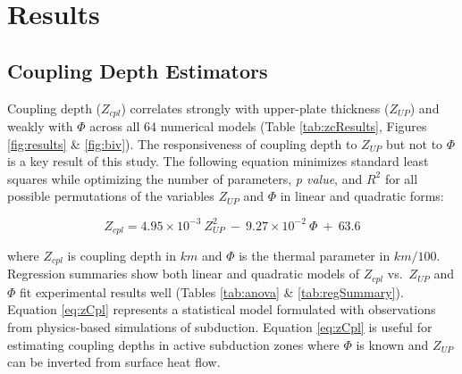 \hypertarget{chpt2Results}{%
\section{Results}\label{chpt2Results}}

\hypertarget{cdEstimators}{%
\subsection{Coupling Depth Estimators}\label{cdEstimators}}

Coupling depth (\(Z_{cpl}\)) correlates strongly with upper-plate thickness (\(Z_{UP}\)) and weakly with \(\Phi\) across all 64 numerical models (Table \ref{tab:zcResults}, Figures \ref{fig:results} \& \ref{fig:biv}). The responsiveness of coupling depth to \(Z_{UP}\) but not to \(\Phi\) is a key result of this study. The following equation minimizes standard least squares while optimizing the number of parameters, \emph{p value}, and \(R^2\) for all possible permutations of the variables \(Z_{UP}\) and \(\Phi\) in linear and quadratic forms:

\begin{equation}
  Z_{cpl} = 4.95\times 10^{-3}\ Z_{UP}^{2}\ -\ 9.27\times 10^{-2}\ \Phi\ +\ 63.6
  \label{eq:zCpl}
\end{equation}

where \(Z_{cpl}\) is coupling depth in \(km\) and \(\Phi\) is the thermal parameter in \(km/100\). Regression summaries show both linear and quadratic models of \(Z_{cpl}\) vs.~\(Z_{UP}\) and \(\Phi\) fit experimental results well (Tables \ref{tab:anova} \& \ref{tab:regSummary}). Equation \eqref{eq:zCpl} represents a statistical model formulated with observations from physics-based simulations of subduction. Equation \eqref{eq:zCpl} is useful for estimating coupling depths in active subduction zones where \(\Phi\) is known and \(Z_{UP}\) can be inverted from surface heat flow.

